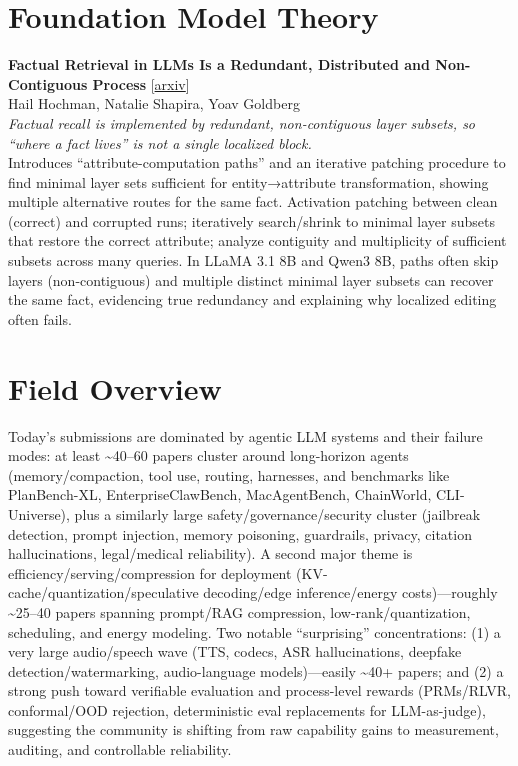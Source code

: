 \documentclass[12pt,letterpaper]{article}
\begin{document}
\medskip


\section*{Foundation Model Theory}

{\small\textbf{Factual Retrieval in LLMs Is a Redundant, Distributed and Non-Contiguous Process}} {\scriptsize[\href{https://arxiv.org/abs/2606.21345}{arxiv}]}\\
{\scriptsize Hail Hochman, Natalie Shapira, Yoav Goldberg}\\

{\small\textit{Factual recall is implemented by redundant, non-contiguous layer subsets, so ``where a fact lives'' is not a single localized block.}}\\[1pt]
{\footnotesize Introduces ``attribute-computation paths'' and an iterative patching procedure to find minimal layer sets sufficient for entity→attribute transformation, showing multiple alternative routes for the same fact. Activation patching between clean (correct) and corrupted runs; iteratively search/shrink to minimal layer subsets that restore the correct attribute; analyze contiguity and multiplicity of sufficient subsets across many queries. In LLaMA 3.1 8B and Qwen3 8B, paths often skip layers (non-contiguous) and multiple distinct minimal layer subsets can recover the same fact, evidencing true redundancy and explaining why localized editing often fails.}

\medskip



\section*{Field Overview}
{\footnotesize Today's submissions are dominated by agentic LLM systems and their failure modes: at least \textasciitilde{}40--60 papers cluster around long-horizon agents (memory/compaction, tool use, routing, harnesses, and benchmarks like PlanBench-XL, EnterpriseClawBench, MacAgentBench, ChainWorld, CLI-Universe), plus a similarly large safety/governance/security cluster (jailbreak detection, prompt injection, memory poisoning, guardrails, privacy, citation hallucinations, legal/medical reliability). A second major theme is efficiency/serving/compression for deployment (KV-cache/quantization/speculative decoding/edge inference/energy costs)---roughly \textasciitilde{}25--40 papers spanning prompt/RAG compression, low-rank/quantization, scheduling, and energy modeling. Two notable ``surprising'' concentrations: (1) a very large audio/speech wave (TTS, codecs, ASR hallucinations, deepfake detection/watermarking, audio-language models)---easily \textasciitilde{}40+ papers; and (2) a strong push toward verifiable evaluation and process-level rewards (PRMs/RLVR, conformal/OOD rejection, deterministic eval replacements for LLM-as-judge), suggesting the community is shifting from raw capability gains to measurement, auditing, and controllable reliability.}
\end{document}
